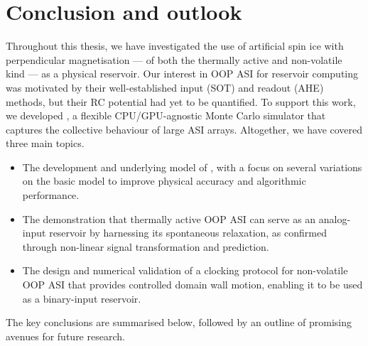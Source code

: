 \chapter{Conclusion and outlook}\label{ch:Conclusion}

Throughout this thesis, we have investigated the use of artificial spin ice with perpendicular magnetisation --- of both the thermally active and non-volatile kind --- as a physical reservoir.
Our interest in OOP ASI for reservoir computing was motivated by their well-established input (SOT) and readout (AHE) methods, but their RC potential had yet to be quantified.
To support this work, we developed \hotspice, a flexible CPU/GPU-agnostic Monte Carlo simulator that captures the collective behaviour of large ASI arrays.
Altogether, we have covered three main topics.
\begin{itemize}
	\item The development and underlying model of \hotspice{}, with a focus on several variations on the basic model to improve physical accuracy and algorithmic performance.
	\item The demonstration that thermally active OOP ASI can serve as an analog-input reservoir by harnessing its spontaneous relaxation, as confirmed through non-linear signal transformation and prediction.
	\item The design and numerical validation of a clocking protocol for non-volatile OOP ASI that provides controlled domain wall motion, enabling it to be used as a binary-input reservoir.
\end{itemize}
The key conclusions are summarised below, followed by an outline of promising avenues for future research.

\newpage
